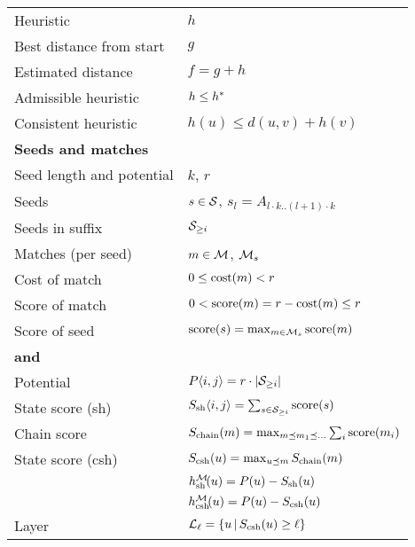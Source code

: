 \begin{table}[h]
\begin{tabular}{ll}
	\tabindent Heuristic & $h$\\
	\tabindent Best distance from start & $g$  \\
	\tabindent Estimated distance & $f = g + h$\\
	\tabindent Admissible heuristic & $h \leq h^*\!$\\
	\tabindent Consistent heuristic & $h(u) \leq d(u,v) + h(v)$\\
	\hline
	\multicolumn{2}{l}{\textbf{Seeds and matches}} \\
	\tabindent Seed length and potential & $k$, $r$ \\
	\tabindent Seeds & $s\in \mathcal S$, $s_l = A_{l \cdot k..(l+1)\cdot k}$ \\
	\tabindent Seeds in suffix & $\mathcal S_{\geq i}$ \\
	\tabindent Matches (per seed)& $m \in \mathcal M$, $\mathcal M_s$\\
	\tabindent Cost of match & $0 \leq \operatorname{cost}(m) < r$\\
	\tabindent Score of match & $0 < \operatorname{score}(m) = r - \operatorname{cost}(m) \leq r$\\
	\tabindent Score of seed & $\operatorname{score}(s) = \max_{m\in \mathcal M_s} \operatorname{score}(m)$\\
	\hline
	\multicolumn{2}{l}{\textbf{\Sh and \csh}} \\
	\tabindent Potential & $P\langle i, j \rangle  = r \cdot |\mathcal S_{\geq i}|$ \\
	\tabindent State score (sh) &
							 $S_{\mathrm{sh}} \langle i, j \rangle = \sum_{s\in \mathcal S_{\geq i}} \operatorname{score}(s)$ \\
	\tabindent Chain score & $S_{\mathrm{chain}}(m) = \max_{m\preceq m_1 \preceq \dots} \sum_i \operatorname{score}(m_i)$\\
	\tabindent State score (csh) & $S_{\mathrm{csh}}(u) = \max_{u\preceq m} S_{\mathrm{chain}}(m)$\\
	\tabindent \Sh & $h_{\mathrm{sh}}^\mathcal M\!(u) = P(u) - S_{\mathrm{sh}}(u)$\\
	\tabindent \Csh & $h_{\mathrm{csh}}^\mathcal M\!(u) = P(u) - S_{\mathrm{csh}}(u)$\\
	\tabindent Layer & $\mathcal L_\ell = \{u\, | \, S_{\mathrm{csh}}(u) \geq \ell\}$
  \end{tabular}
\end{table}

